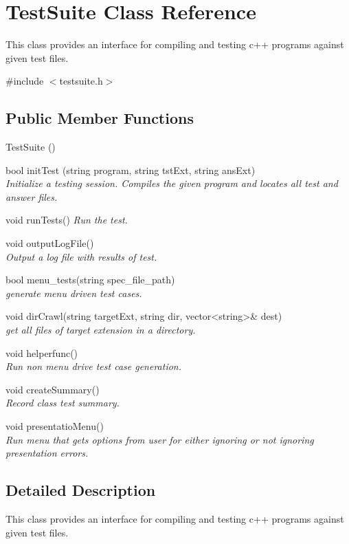 \hypertarget{class_poly}{\section{Test\-Suite Class Reference}
\label{class_poly}
}


This class provides an interface for compiling and testing c++ programs against given test files.  




{\ttfamily \#include $<$testsuite.\-h$>$}

\subsection*{Public Member Functions}
\begin{DoxyCompactItemize}
\item TestSuite ()
\item bool initTest (string program, string tstExt, string ansExt)\\
\textit{Initialize a testing session. Compiles the given program and locates all test and answer files.}  
\item void runTests()
	\textit{ Run the test.}
\item void outputLogFile() \\
	\textit{ Output a log file with results of test.}
\item bool menu\_tests(string spec\_file\_path) \\
 	\textit{generate menu driven test cases.}
\item void dirCrawl(string targetExt, string dir, vector\textless string\textgreater  \& dest)\\
 	\textit{get all files of target extension in a directory.}
 \item void helperfunc() \\
	 \textit{Run non menu drive test case generation.}
 \item void createSummary() \\
	 \textit{Record class test summary.}
 \item void presentatioMenu() \\
	 \textit{Run menu that gets options from user for either ignoring or not ignoring presentation errors.}
\end{DoxyCompactItemize}

\subsection{Detailed Description}
This class provides an interface for compiling and testing c++ programs against given test files. 

